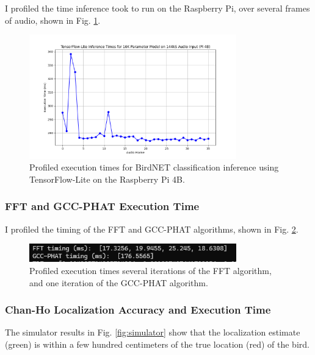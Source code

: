 \documentclass[12pt]{article}
\begin{document}
I profiled the time inference took to run on the Raspberry Pi, over several frames of audio, shown in Fig. \ref{fig:inference_times}.

\begin{figure}[h]
\centering
\includegraphics[width=0.8\textwidth]{Inference_times.png} %
\caption{Profiled execution times for BirdNET classification inference using TensorFlow-Lite on the Raspberry Pi 4B.}
\label{fig:inference_times}
\end{figure}

\subsubsection{FFT and GCC-PHAT Execution Time}

I profiled the timing of the FFT and GCC-PHAT algorithms, shown in Fig. \ref{fig:fft_gcc_timing}.

\begin{figure}[h]
\centering
\includegraphics[width=0.8\textwidth]{fft_gcc_timing.png} %
\caption{Profiled execution times several iterations of the FFT algorithm, and one iteration of the GCC-PHAT algorithm.}
\label{fig:fft_gcc_timing}
\end{figure}

\subsubsection{Chan-Ho Localization Accuracy and Execution Time}

The simulator results in Fig. \ref{fig:simulator} show that the localization estimate (green) is within a few hundred centimeters of the true location (red) of the bird.
\end{document}

